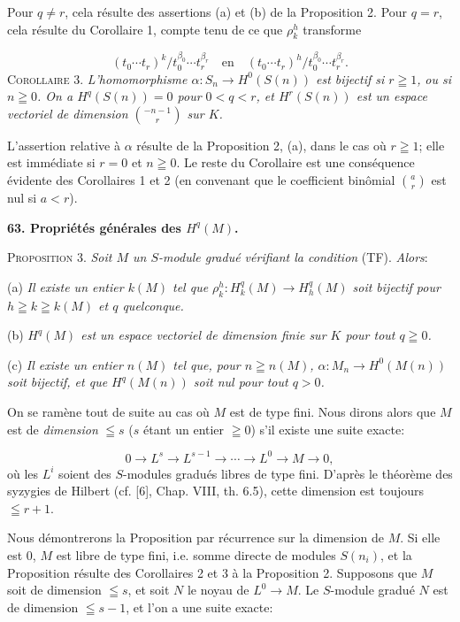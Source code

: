 Pour $q \neq r$, cela résulte des assertions (a) et (b) de la Proposition 2. Pour $q = r$, cela résulte du Corollaire 1, compte tenu de ce que $\rho_k^h$ transforme

\begin{equation*}
(t_0 \cdots t_r)^k/t_0^{\beta_0} \cdots t_r^{\beta_r} \quad \mathrm{en} \quad (t_0 \cdots t_r)^h/t_0^{\beta_0} \cdots t_r^{\beta_r} .
\end{equation*}
\textsc{Corollaire 3.} \textit{L'homomorphisme $\alpha : S_n \to H^0(S(n))$ est bijectif si $r \geqq 1$,}
\textit{ou si $n \geqq 0$. On a $H^q(S(n)) = 0$ pour $0 < q < r$, et $H^r(S(n))$ est un espace vectoriel de dimension $\binom{-n-1}{r}$ sur $K$.}

L'assertion relative à $\alpha$ résulte de la Proposition 2, (a), dans le cas où $r \geqq 1$; elle est immédiate si $r = 0$ et $n \geqq 0$. Le reste du Corollaire est une conséquence évidente des Corollaires 1 et 2 (en convenant que le coefficient binômial $\binom{a}{r}$ est nul si $a < r$).


\textbf{63. Propriétés générales des $H^q(M)$.}

\textsc{Proposition 3.} \textit{Soit $M$ un $S$-module gradué vérifiant la condition} (TF). \textit{Alors}:

(a) \textit{Il existe un entier $k(M)$ tel que $\rho_k^h : H_k^q(M) \to H_h^q(M)$ soit bijectif pour $h \geqq k \geqq k(M)$ et $q$ quelconque.}

(b) \textit{$H^q(M)$ est un espace vectoriel de dimension finie sur $K$ pour tout $q \geqq 0$.}

(c) \textit{Il existe un entier $n(M)$ tel que, pour $n \geqq n(M)$, $\alpha : M_n \to H^0(M(n))$ soit bijectif, et que $H^q(M(n))$ soit nul pour tout $q > 0$.}

On se ramène tout de suite au cas où $M$ est de type fini. Nous dirons alors que $M$ est de \textit{dimension} $\leqq s$ ($s$ étant un entier $\geqq 0$) s'il existe une suite exacte:

\begin{equation*}
0 \to L^s \to L^{s-1} \to \cdots \to L^0 \to M \to 0,
\end{equation*}
où les $L^i$ soient des $S$-modules gradués libres de type fini. D'après le théorème des syzygies de Hilbert (cf. [6], Chap. VIII, th. 6.5), cette dimension est toujours $\leqq r + 1$.

Nous démontrerons la Proposition par récurrence sur la dimension de $M$. Si elle est 0, $M$ est libre de type fini, i.e. somme directe de modules $S(n_i)$, et la Proposition résulte des Corollaires 2 et 3 à la Proposition 2. Supposons que $M$ soit de dimension $\leqq s$, et soit $N$ le noyau de $L^0 \to M$. Le $S$-module gradué $N$ est de dimension $\leqq s - 1$, et l'on a une suite exacte:

